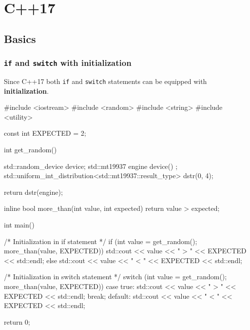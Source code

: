 \documentclass[../main]{subfiles}
\begin{document}
\chapter{C++17}
\section{Basics}
\subsection{\texttt{if} and \texttt{switch} with initialization}
    Since C++17 both \texttt{if} and \texttt{switch} statements can be equipped with \textbf{initialization}.
\begin{Code}
    #include <iostream>
    #include <random>
    #include <string>
    #include <utility>
    
    const int EXPECTED = 2;
    
    int get_random()
    {
        std::random_device device;
        std::mt19937 engine { device() };
        std::uniform_int_distribution<std::mt19937::result_type> dstr(0, 4);
        
        return dstr(engine);
    }
    
    inline bool more_than(int value, int expected)
    {
        return value > expected;
    }
    
    int main()
    {
        /* Initialization in if statement */
        if (int value = get_random(); more_than(value, EXPECTED)) 
        {
            std::cout << value << " > " << EXPECTED << std::endl;
        }
        else
        {
            std::cout << value << " < " << EXPECTED << std::endl;
        }

        /* Initialization in switch statement */
        switch (int value = get_random(); more_than(value, EXPECTED))
        {
            case true:
                std::cout << value << " > " << EXPECTED << std::endl;
                break;
            default:
                std::cout << value << " < " << EXPECTED << std::endl;
        }
    
        return 0;
    }
\end{Code}
\end{document}
